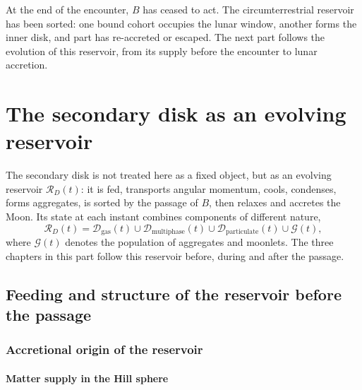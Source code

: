 \documentclass[11pt,a4paper,openany]{report}
\newcommand{\RD}{\mathcal{R}_{D}}
\begin{document}

\begin{rappel}
At the end of the encounter, $B$ has ceased to act. The circumterrestrial reservoir has been
sorted: one bound cohort occupies the lunar window, another forms the inner disk, and part has
re-accreted or escaped. The next part follows the evolution of this reservoir, from its supply
before the encounter to lunar accretion.
\end{rappel}

\part{The secondary disk as an evolving reservoir}
\label{part:reservoir}

\noindent
The secondary disk is not treated here as a fixed object, but as an evolving reservoir $\RD(t)$: it
is fed, transports angular momentum, cools, condenses, forms aggregates, is sorted by the passage
of $B$, then relaxes and accretes the Moon. Its state at each instant combines components of
different nature,
\begin{equation}
\RD(t)=\mathcal{D}_{\mathrm{gas}}(t)\cup\mathcal{D}_{\mathrm{multiphase}}(t)\cup
\mathcal{D}_{\mathrm{particulate}}(t)\cup\mathcal{G}(t),
\label{eq:RD}
\end{equation}
where $\mathcal{G}(t)$ denotes the population of aggregates and moonlets. The three chapters in
this part follow this reservoir before, during and after the passage.

\chapter{Feeding and structure of the reservoir before the passage}
\label{ch:structure}

\section{Accretional origin of the reservoir}
\subsection{Matter supply in the Hill sphere}
\end{document}
